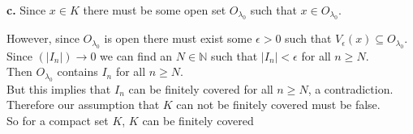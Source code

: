\documentclass{article}
\begin{document}
{\Large \textbf{c.}} Since $x\in K$ there must be some open set $O_{\lambda _0}$ such that $x\in O_{\lambda _0}$.
\begin{center}
    \doublespacing
    However, since $O_{\lambda _0}$ is open there must exist some $\epsilon > 0$ such that $V_{\epsilon} (x)\subseteq O_{\lambda _0}$.
    \\Since $(|I_n|)\rightarrow 0$ we can find an $N\in\mathbb{N}$ such that $|I_n| <\epsilon$ for all $n\geq N$.
    \\Then $O_{\lambda _0}$ contains $I_n$ for all $n\geq N$.
    \\But this implies that $I_n$ can be finitely covered for all $n\geq N$, a contradiction.
    \\Therefore our assumption that $K$ can not be finitely covered must be false.
    \\So for a compact set $K$, $K$ can be finitely covered \qedsymbol
\end{center}


\newpage
\end{document}
